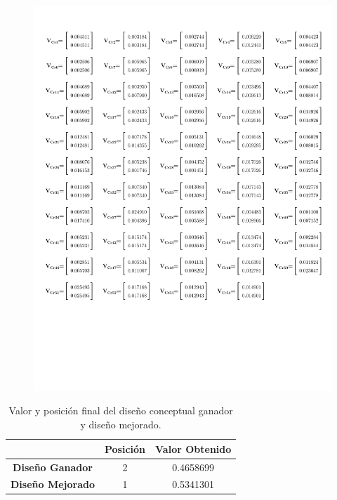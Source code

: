 \newpage
\begin{figure}[H]
	\centering
	\includegraphics[width=14.5cm]{imagenes/54VectoresDePrioridadMejoradoEx}
	\label{fig:54VectoresDePrioridadEx1}
\end{figure}

\newpage
\begin{table}[H]
	\centering
	\caption{Valor y posición final del diseño conceptual ganador y diseño mejorado.}
	\begin{tabular}{ccc}
		\hline
		& \textbf{Posición} & \textbf{Valor Obtenido} \\
		\hline
		\hline
		\textbf{Diseño Ganador} & 2     & 0.4658699 \\
		\textbf{Diseño Mejorado} & 1     & 0.5341301 \\
		\hline
	\end{tabular}%
	\label{tab:finalmejorado}%
\end{table}%

\bigskip

\endinput 